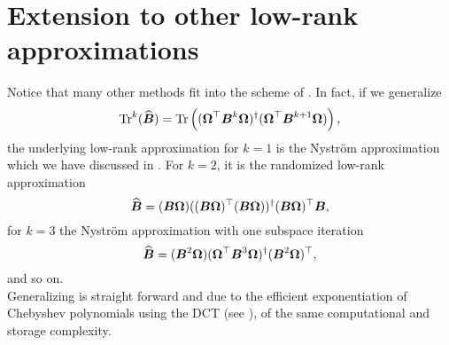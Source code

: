 \section{Extension to other low-rank approximations}
\label{sec:3-nystrom-other-low-rank}

Notice that many other methods \cite{halko2011finding,tropp2023randomized} fit
into the scheme of . In fact, if we
generalize
\begin{equation}
    \operatorname{Tr}^{k}(\widehat{\boldsymbol{B}})
        = \operatorname{Tr}\left((\boldsymbol{\Omega}^{\top} \boldsymbol{B}^k \boldsymbol{\Omega})^{\dagger} (\boldsymbol{\Omega}^{\top} \boldsymbol{B}^{k+1} \boldsymbol{\Omega}) \right),
    \label{equ:3-nystrom-trace-generalization}
\end{equation}
the underlying low-rank approximation for $k=1$ is the Nystr\"om approximation
which we have discussed in .
For $k=2$, it is the randomized low-rank approximation \cite{halko2011finding, tropp2023randomized}
\begin{equation}
    \widehat{\boldsymbol{B}} = (\boldsymbol{B} \boldsymbol{\Omega}) ((\boldsymbol{B} \boldsymbol{\Omega})^{\top} (\boldsymbol{B} \boldsymbol{\Omega}))^{\dagger} (\boldsymbol{B} \boldsymbol{\Omega})^{\top} \boldsymbol{B},
    \label{equ:3-nystrom-RSVD}
\end{equation}
for $k=3$ the Nystr\"om approximation with one subspace iteration \cite{tropp2023randomized}
\begin{equation}
    \widehat{\boldsymbol{B}} = (\boldsymbol{B}^2 \boldsymbol{\Omega}) (\boldsymbol{\Omega}^{\top} \boldsymbol{B}^3 \boldsymbol{\Omega})^{\dagger} (\boldsymbol{B}^2 \boldsymbol{\Omega})^{\top},
    \label{equ:3-nystrom-nystrom-SI}
\end{equation}
and so on.\\

Generalizing  is straight forward and
due to the efficient exponentiation of Chebyshev polynomials using the \gls{DCT}
(see ), of the same
computational and storage complexity.
